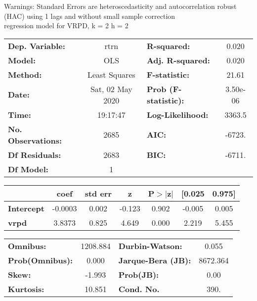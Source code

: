 Warnings: \newline
 [1] Standard Errors are heteroscedasticity and autocorrelation robust (HAC) using 1 lags and without small sample correction\\ 

regression model for VRPD, k = 2 h = 2\begin{center}
\begin{tabular}{lclc}
\toprule
\textbf{Dep. Variable:}    &       rtrn       & \textbf{  R-squared:         } &     0.020   \\
\textbf{Model:}            &       OLS        & \textbf{  Adj. R-squared:    } &     0.020   \\
\textbf{Method:}           &  Least Squares   & \textbf{  F-statistic:       } &     21.61   \\
\textbf{Date:}             & Sat, 02 May 2020 & \textbf{  Prob (F-statistic):} &  3.50e-06   \\
\textbf{Time:}             &     19:17:47     & \textbf{  Log-Likelihood:    } &    3363.5   \\
\textbf{No. Observations:} &        2685      & \textbf{  AIC:               } &    -6723.   \\
\textbf{Df Residuals:}     &        2683      & \textbf{  BIC:               } &    -6711.   \\
\textbf{Df Model:}         &           1      & \textbf{                     } &             \\
\bottomrule
\end{tabular}
\begin{tabular}{lcccccc}
                   & \textbf{coef} & \textbf{std err} & \textbf{z} & \textbf{P$> |$z$|$} & \textbf{[0.025} & \textbf{0.975]}  \\
\midrule
\textbf{Intercept} &      -0.0003  &        0.002     &    -0.123  &         0.902        &       -0.005    &        0.005     \\
\textbf{vrpd}      &       3.8373  &        0.825     &     4.649  &         0.000        &        2.219    &        5.455     \\
\bottomrule
\end{tabular}
\begin{tabular}{lclc}
\textbf{Omnibus:}       & 1208.884 & \textbf{  Durbin-Watson:     } &    0.055  \\
\textbf{Prob(Omnibus):} &   0.000  & \textbf{  Jarque-Bera (JB):  } & 8672.364  \\
\textbf{Skew:}          &  -1.993  & \textbf{  Prob(JB):          } &     0.00  \\
\textbf{Kurtosis:}      &  10.851  & \textbf{  Cond. No.          } &     390.  \\
\bottomrule
\end{tabular}
\end{center}

